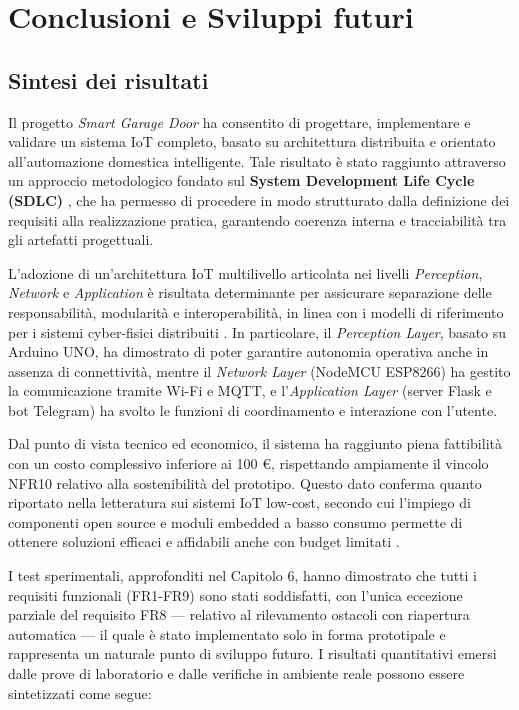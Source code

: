 \chapter{Conclusioni e Sviluppi futuri}

\section{Sintesi dei risultati}
Il progetto \textit{Smart Garage Door} ha consentito di progettare, implementare e validare un sistema IoT completo, basato su architettura distribuita e orientato all'automazione domestica intelligente. Tale risultato è stato raggiunto attraverso un approccio metodologico fondato sul \textbf{System Development Life Cycle (SDLC)} \cite{Pressman2019}, che ha permesso di procedere in modo strutturato dalla definizione dei requisiti alla realizzazione pratica, garantendo coerenza interna e tracciabilità tra gli artefatti progettuali.

L'adozione di un'architettura IoT multilivello articolata nei livelli \textit{Perception}, \textit{Network} e \textit{Application} è risultata determinante per assicurare separazione delle responsabilità, modularità e interoperabilità, in linea con i modelli di riferimento per i sistemi cyber-fisici distribuiti \cite{Gubbi2013, Lee2015}. In particolare, il \textit{Perception Layer}, basato su Arduino UNO, ha dimostrato di poter garantire autonomia operativa anche in assenza di connettività, mentre il \textit{Network Layer} (NodeMCU ESP8266) ha gestito la comunicazione tramite Wi-Fi e MQTT, e l'\textit{Application Layer} (server Flask e bot Telegram) ha svolto le funzioni di coordinamento e interazione con l'utente.

Dal punto di vista tecnico ed economico, il sistema ha raggiunto piena fattibilità con un costo complessivo inferiore ai 100 €, rispettando ampiamente il vincolo NFR10 relativo alla sostenibilità del prototipo. Questo dato conferma quanto riportato nella letteratura sui sistemi IoT low-cost, secondo cui l'impiego di componenti open source e moduli embedded a basso consumo permette di ottenere soluzioni efficaci e affidabili anche con budget limitati \cite{Zanella2014}.

I test sperimentali, approfonditi nel Capitolo 6, hanno dimostrato che tutti i requisiti funzionali (FR1-FR9) sono stati soddisfatti, con l'unica eccezione parziale del requisito FR8 — relativo al rilevamento ostacoli con riapertura automatica — il quale è stato implementato solo in forma prototipale e rappresenta un naturale punto di sviluppo futuro. I risultati quantitativi emersi dalle prove di laboratorio e dalle verifiche in ambiente reale possono essere sintetizzati come segue:

